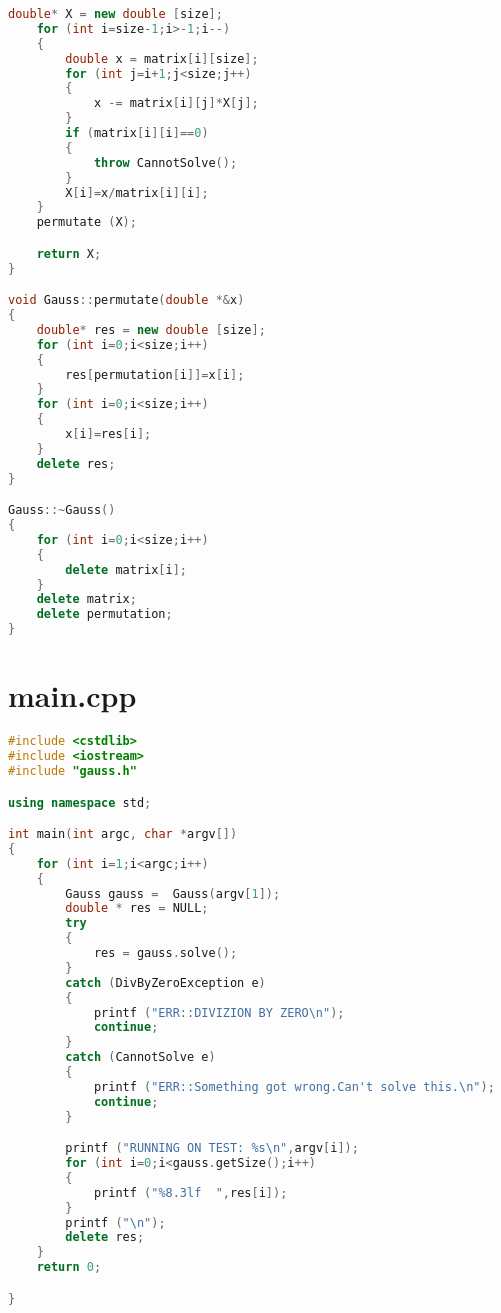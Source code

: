 \documentclass[a4paper,11pt]{article}
\begin{document}
\begin{lstlisting}[language=c++, style=eclipse]
    double* X = new double [size];
    for (int i=size-1;i>-1;i--)
    {
        double x = matrix[i][size];
        for (int j=i+1;j<size;j++)
        {
            x -= matrix[i][j]*X[j];
        }
        if (matrix[i][i]==0)
        {
            throw CannotSolve();
        }
        X[i]=x/matrix[i][i];
    }
    permutate (X);

    return X;
}

void Gauss::permutate(double *&x)
{
    double* res = new double [size];
    for (int i=0;i<size;i++)
    {
        res[permutation[i]]=x[i];
    }
    for (int i=0;i<size;i++)
    {
        x[i]=res[i];
    }
    delete res;
}

Gauss::~Gauss()
{
    for (int i=0;i<size;i++)
    {
        delete matrix[i];
    }
    delete matrix;
    delete permutation;
}
\end{lstlisting}
\newpage
\section*{main.cpp}
\begin{lstlisting}[language=c++, style=eclipse]
#include <cstdlib>
#include <iostream>
#include "gauss.h"

using namespace std;

int main(int argc, char *argv[])
{
    for (int i=1;i<argc;i++)
    {
        Gauss gauss =  Gauss(argv[1]);
        double * res = NULL;
        try
        {
            res = gauss.solve();
        }
        catch (DivByZeroException e)
        {
            printf ("ERR::DIVIZION BY ZERO\n");
            continue;
        }
        catch (CannotSolve e)
        {
            printf ("ERR::Something got wrong.Can't solve this.\n");
            continue;
        }

        printf ("RUNNING ON TEST: %s\n",argv[i]);
        for (int i=0;i<gauss.getSize();i++)
        {
            printf ("%8.3lf  ",res[i]);
        }
        printf ("\n");
        delete res;
    }
    return 0;

}
\end{lstlisting}
\newpage
\end{document}
